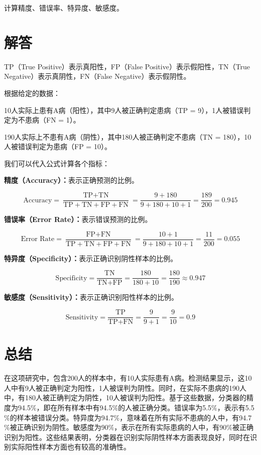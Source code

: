 \documentclass[10.5pt,compsoc,UTF8]{CjC}
\theoremstyle{mystyle}
\begin{document}
计算精度、错误率、特异度、敏感度。
\section{\heiti 解答}

TP（True Positive）表示真阳性，FP（False Positive）表示假阳性，TN（True Negative）表示真阴性，FN（False Negative）表示假阴性。

根据给定的数据：

10人实际上患有A病（阳性），其中9人被正确判定患病（TP = 9），1人被错误判定为不患病（FN = 1）。

190人实际上不患有A病（阴性），其中180人被正确判定不患病（TN = 180），10人被错误判定为患病（FP = 10）。

我们可以代入公式计算各个指标：

\textbf{精度（Accuracy）：}表示正确预测的比例。

\[
\text{Accuracy} = \frac{\text{TP} + \text{TN}}{\text{TP} + \text{TN} + \text{FP} + \text{FN}} = \frac{9 + 180}{9 + 180 + 10 + 1} = \frac{189}{200} = 0.945
\]

\textbf{错误率（Error Rate）：}表示错误预测的比例。

\[
\text{Error Rate} = \frac{\text{FP} + \text{FN}}{\text{TP} + \text{TN} + \text{FP} + \text{FN}} = \frac{10 + 1}{9 + 180 + 10 + 1} = \frac{11}{200} = 0.055
\]


\textbf{特异度（Specificity）：}表示正确识别阴性样本的比例。

\[
\text{Specificity} = \frac{\text{TN}}{\text{TN} + \text{FP}} = \frac{180}{180 + 10} = \frac{180}{190} \approx 0.947
\]


\textbf{敏感度（Sensitivity）：}表示正确识别阳性样本的比例。

\[
\text{Sensitivity} = \frac{\text{TP}}{\text{TP} + \text{FN}} = \frac{9}{9 + 1} = \frac{9}{10} = 0.9
\]

\section{\heiti 总结}

在这项研究中，包含200人的样本中，有10人实际患有A病。检测结果显示，这10人中有9人被正确判定为阳性，1人被误判为阴性。同时，在实际不患病的190人中，有180人被正确判定为阴性，10人被误判为阳性。基于这些数据，分类器的精度为94.5$\%$，即在所有样本中有94.5$\%$的人被正确分类。错误率为5.5$\%$，表示有5.5$\%$的样本被错误分类。特异度为94.7$\%$，意味着在所有实际不患病的人中，有94.7$\%$被正确识别为阴性。敏感度为90$\%$，表示在所有实际患病的人中，有90$\%$被正确识别为阳性。这些结果表明，分类器在识别实际阴性样本方面表现良好，同时在识别实际阳性样本方面也有较高的准确性。
\end{document}
